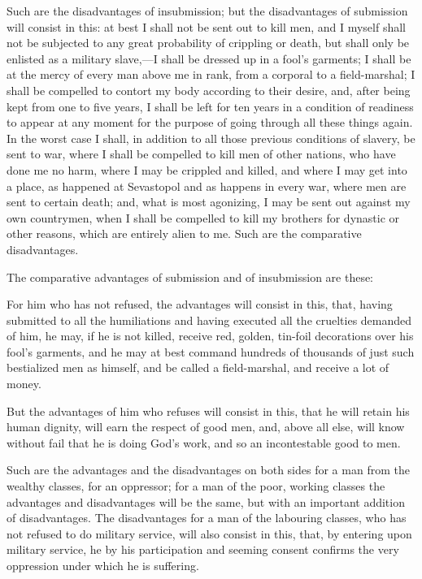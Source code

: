 \documentclass{book}
\begin{document}
Such are the disadvantages of insubmission; but the disadvantages of submission will consist in this: at best I shall not be sent out to kill men, and I myself shall not be subjected to any great probability of crippling or death, but shall only be enlisted as a military slave,—I shall be dressed up in a fool’s garments; I shall be at the mercy of every man above me in rank, from a corporal to a field-marshal; I shall be compelled to contort my body according to their desire, and, after being kept from one to five years, I shall be left for ten years in a condition of readiness to appear at any moment for the purpose of going through all these things again. In the worst case I shall, in addition to all those previous conditions of slavery, be sent to war, where I shall be compelled to kill men of other nations, who have done me no harm, where I may be crippled and killed, and where I may get into a place, as happened at Sevastopol and as happens in every war, where men are sent to certain death; and, what is most agonizing, I may be sent out against my own countrymen, when I shall be compelled to kill my brothers for dynastic or other reasons, which are entirely alien to me. Such are the comparative disadvantages.

The comparative advantages of submission and of insubmission are these:

For him who has not refused, the advantages will consist in this, that, having submitted to all the humiliations and having executed all the cruelties demanded of him, he may, if he is not killed, receive red, golden, tin-foil decorations over his fool’s garments, and he may at best command hundreds of thousands of just such bestialized men as himself, and be called a field-marshal, and receive a lot of money.

But the advantages of him who refuses will consist in this, that he will retain his human dignity, will earn the respect of good men, and, above all else, will know without fail that he is doing God’s work, and so an incontestable good to men.

Such are the advantages and the disadvantages on both sides for a man from the wealthy classes, for an oppressor; for a man of the poor, working classes the advantages and disadvantages will be the same, but with an important addition of disadvantages. The disadvantages for a man of the labouring classes, who has not refused to do military service, will also consist in this, that, by entering upon military service, he by his participation and seeming consent confirms the very oppression under which he is suffering.
\end{document}
